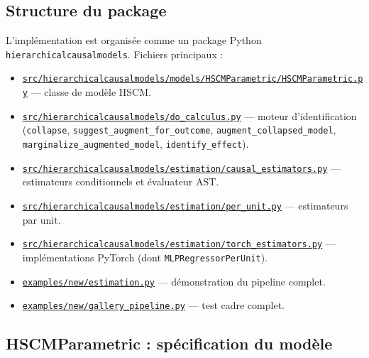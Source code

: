 \documentclass[11pt,a4paper]{article}
\begin{document}
\subsection{Structure du package}

L'implémentation est organisée comme un package Python \texttt{hierarchicalcausalmodels}. Fichiers principaux :
\begin{itemize}
  \item \href{https://github.com/janisaiad/hierarchicalcausalmodels/blob/psc/src/hierarchicalcausalmodels/models/HSCMParametric/HSCMParametric.py}{\texttt{src/hierarchicalcausalmodels/models/HSCMParametric/HSCMParametric.py}} — classe de modèle HSCM.
  \item \href{https://github.com/janisaiad/hierarchicalcausalmodels/blob/psc/src/hierarchicalcausalmodels/do_calculus.py}{\texttt{src/hierarchicalcausalmodels/do\_calculus.py}} — moteur d'identification (\texttt{collapse}, \texttt{suggest\_augment\_for\_outcome}, \texttt{augment\_collapsed\_model}, \texttt{marginalize\_augmented\_model}, \texttt{identify\_effect}).
  \item \href{https://github.com/janisaiad/hierarchicalcausalmodels/blob/psc/src/hierarchicalcausalmodels/estimation/causal_estimators.py}{\texttt{src/hierarchicalcausalmodels/estimation/causal\_estimators.py}} — estimateurs conditionnels et évaluateur AST.
  \item \href{https://github.com/janisaiad/hierarchicalcausalmodels/blob/psc/src/hierarchicalcausalmodels/estimation/per_unit.py}{\texttt{src/hierarchicalcausalmodels/estimation/per\_unit.py}} — estimateurs par unit.
  \item \href{https://github.com/janisaiad/hierarchicalcausalmodels/blob/psc/src/hierarchicalcausalmodels/estimation/torch_estimators.py}{\texttt{src/hierarchicalcausalmodels/estimation/torch\_estimators.py}} — implémentations PyTorch (dont \texttt{MLPRegressorPerUnit}).
  \item \href{https://github.com/janisaiad/hierarchicalcausalmodels/blob/psc/examples/new/estimation.py}{\texttt{examples/new/estimation.py}} — démonstration du pipeline complet.
  \item \href{https://github.com/janisaiad/hierarchicalcausalmodels/blob/psc/examples/new/gallery_pipeline.py}{\texttt{examples/new/gallery\_pipeline.py}} — test cadre complet.
\end{itemize}

\subsection{HSCMParametric : spécification du modèle}
\end{document}
